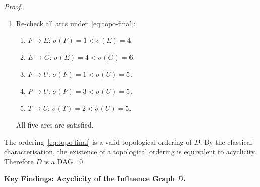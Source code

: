 \documentclass[12pt,openany]{book}
\newcommand{\calE}{\mathcal{E}}
\newcommand{\calF}{\mathcal{F}}
\newcommand{\calG}{\mathcal{G}}
\newcommand{\calP}{\mathcal{P}}
\newcommand{\calU}{\mathcal{U}}
\newcommand{\calT}{\mathcal{T}}
\numberwithin{equation}{chapter}
\theoremstyle{plain}
\theoremstyle{definition}
\theoremstyle{remark}
\def\mathcal#1{#1}%
\begin{document}
\begin{proof}
\begin{enumerate}
  \item Re-check all arcs under~\eqref{eq:topo-final}:
        \begin{enumerate}
          \item[(a)] $\calF \to \calE$:
                $\sigma(\calF)=1 < \sigma(\calE)=4$.
                \checkmark
          \item[(b)] $\calE \to \calG$:
                $\sigma(\calE)=4 < \sigma(\calG)=6$.
                \checkmark
          \item[(c)] $\calF \to \calU$:
                $\sigma(\calF)=1 < \sigma(\calU)=5$.
                \checkmark
          \item[(d)] $\calP \to \calU$:
                $\sigma(\calP)=3 < \sigma(\calU)=5$.
                \checkmark
          \item[(e)] $\calT \to \calU$:
                $\sigma(\calT)=2 < \sigma(\calU)=5$.
                \checkmark
        \end{enumerate}
        All five arcs are satisfied.  \checkmark
\end{enumerate}

The ordering~\eqref{eq:topo-final} is a valid topological
ordering of $\mathcal{D}$.  By the classical characterisation,
the existence of a topological ordering is equivalent to
acyclicity.  Therefore $\mathcal{D}$ is a DAG.  \qed
\end{proof}

\noindent
\textbf{Key Findings: Acyclicity of the Influence
Graph $\mathcal{D}$.}
\end{document}
